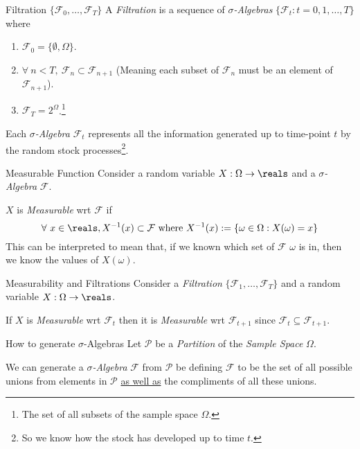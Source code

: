 \documentclass[11pt,a4paper]{article}
\begin{document}
  \begin{definition}{Filtration $\{\mathcal{F}_0,\dots,\mathcal{F}_T\}$}
    A \textit{Filtration} is a sequence of \textit{$\sigma$-Algebras} $\{\mathcal{F}_t:t=0,1,\dots,T\}$ where
    \begin{enumerate}
      \item $\mathcal{F}_0=\{\emptyset,\Omega\}$.
      \item $\forall\ n<T,\ \mathcal{F}_n\subset\mathcal{F}_{n+1}$ (Meaning each subset of $\mathcal{F}_n$ must be an element of $\mathcal{F}_{n+1}$).
      \item $\mathcal{F}_T=2^\Omega$.\footnote{The set of all subsets of the sample space $\Omega$.}
    \end{enumerate}
    Each \textit{$\sigma$-Algebra} $\mathcal{F}_t$ represents all the information generated up to time-point $t$ by the random stock processes\footnote{So we know how the stock has developed up to time $t$.}.
  \end{definition}

  \begin{definition}{Measurable Function}
    Consider a random variable $X:\Omega\to\reals$ and a \textit{$\sigma$-Algebra} $\mathcal{F}$.
    \par $X$ is \textit{Measurable} wrt $\mathcal{F}$ if
    \[ \forall\ x\in\reals, X^{-1}(x)\subset\mathcal{F}\text{ where }X^{-1}(x):=\{\omega\in\Omega:X(\omega)=x\} \]
    This can be interpreted to mean that, if we known which set of $\mathcal{F}$ $\omega$ is in, then we know the values of $X(\omega)$.
  \end{definition}

  \begin{proposition}{Measurability and Filtrations}
    Consider a \textit{Filtration} $\{\mathcal{F}_1,\dots,\mathcal{F}_T\}$ and a random variable $X:\Omega\to\reals$.
    \par If $X$ is \textit{Measurable} wrt $\mathcal{F}_t$ then it is \textit{Measurable} wrt $\mathcal{F}_{t+1}$ since $\mathcal{F}_t\subseteq\mathcal{F}_{t+1}$.
  \end{proposition}

  \begin{proposition}{How to generate $\sigma$-Algebras}\label{prop_generate_sigma_algebras}
    Let $\mathcal{P}$ be a \textit{Partition} of the \textit{Sample Space} $\Omega$.
    \par We can generate a \textit{$\sigma$-Algebra} $\mathcal{F}$ from $\mathcal{P}$ be defining $\mathcal{F}$ to be the set of all possible unions from elements in $\mathcal{P}$ \underline{as well as} the compliments of all these unions.
  \end{proposition}
\end{document}
